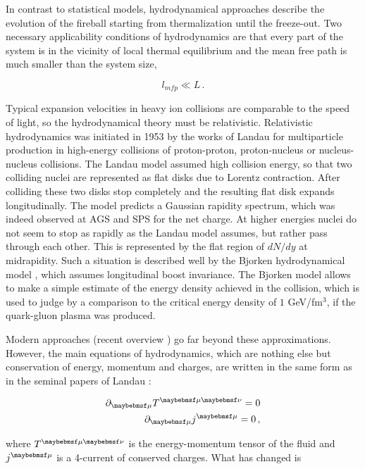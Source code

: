 In contrast to statistical models, hydrodynamical approaches describe the
evolution of the fireball starting from thermalization until the
freeze-out.  Two necessary applicability conditions of hydrodynamics are
that every part of the system is in the vicinity of local thermal
equilibrium and the mean free path is much smaller than the system size,

\begin{equation} \label{eq:hydro_applicability}
  l_{mfp} \ll L \,.
\end{equation}

Typical expansion velocities in heavy ion collisions are comparable to the
speed of light, so the hydrodynamical theory must be relativistic.
Relativistic hydrodynamics was initiated in 1953 by the works of Landau for
multiparticle production in high-energy collisions of proton-proton,
proton-nucleus or nucleus-nucleus collisions\cite{Landau:1953gs,Belenkij:1956cd}. The
Landau model assumed high collision energy, so that two colliding nuclei are
represented as flat disks due to Lorentz contraction.  After colliding these
two disks stop completely and the resulting flat disk expands
longitudinally.  The model predicts a Gaussian rapidity spectrum, which was
indeed observed at AGS and SPS for the net charge.  At higher energies nuclei
do not seem to stop as rapidly as the Landau model assumes, but rather pass through
each other.  This is represented by the flat region of $dN/dy$ at midrapidity.
Such a situation is described well by the Bjorken hydrodynamical model
\cite{Bjorken:1982qr}, which assumes longitudinal boost invariance. The Bjorken
model allows to make a simple estimate of the energy density achieved in the
collision, which is used to judge by a comparison to the critical energy density
of $1$ GeV/fm$^3$, if the quark-gluon plasma was produced.

Modern approaches (recent overview \cite{deSouza:2015ena}) go far beyond these
approximations. However, the main equations of hydrodynamics, which are nothing
else but conservation of energy, momentum and charges, are written in the same
form as in the seminal papers of Landau \cite{Landau:1953gs,Belenkij:1956cd}:

\begin{align}
\partial_{\mu}\Tmn = 0 \\
\partial_{\mu}\jmu = 0 \,,
\end{align}

where $\Tmn$ is the energy-momentum tensor of the fluid and $\jmu$ is a
4-current of conserved charges. What has changed is

